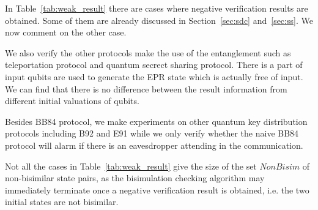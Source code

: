 \documentclass[a4paper,runningheads]{llncs}
\begin{document}
In Table~\ref{tab:weak_result} there are cases where negative verification results are obtained. Some of them are already discussed in Section~\ref{sec:sdc} and~\ref{sec:ss}. We now comment on the other case.

We also verify the other protocols make the use of the entanglement such as teleportation protocol and quantum secrect sharing protocol. There is a part of input qubits are used to generate the EPR state which is actually free of input. We can find that there is no difference between the result information from different initial valuations of qubits.

Besides BB84 protocol, we make experiments on other quantum key distribution protocols including B92 and E91 while we only verify whether the naive BB84 protocol will alarm if there is an eavesdropper attending in the communication.

Not all the cases in Table~\ref{tab:weak_result} give the size of the set $NonBisim$ of non-bisimilar state pairs, as the bisimulation checking algorithm may immediately terminate once a negative verification result is obtained, i.e. the two initial states are not bisimilar. 
\end{document}
